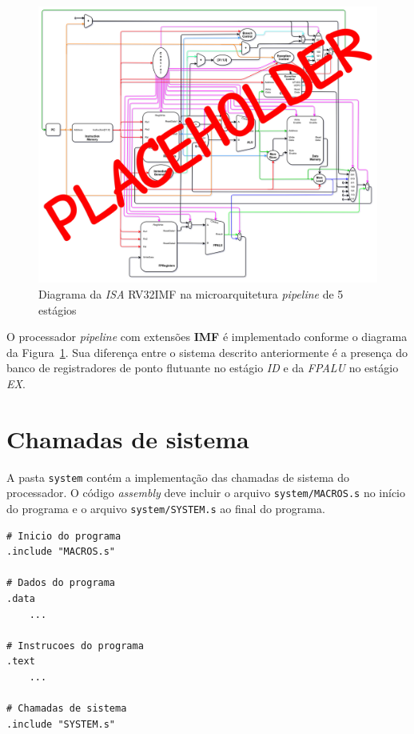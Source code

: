         \begin{figure}[H]
        \centering
            \includegraphics[width=.9\linewidth]{../images/uarch_diagrams/pipeline-RV32IMF.png}
            \caption{Diagrama da \textit{ISA} RV32IMF na microarquitetura
                \textit{pipeline} de 5 estágios}\label{fig:diagram_rv32imf_pipe}
        \end{figure}

        { O processador \textit{pipeline} com extensões \textbf{IMF} é implementado
            conforme o diagrama da Figura~\ref{fig:diagram_rv32imf_pipe}. Sua
            diferença entre o sistema descrito anteriormente é a presença do
            banco de registradores de ponto flutuante no estágio \textit{ID} e
            da \textit{FPALU} no estágio \textit{EX}.
        }

\section{Chamadas de sistema}
    { A pasta \texttt{system} contém a implementação das chamadas de sistema do
        processador. O código \textit{assembly} deve incluir o arquivo
        \texttt{system/MACROS.s} no início do programa e o arquivo
        \texttt{system/SYSTEM.s} ao final do programa.
    }
    \begin{lstlisting}
# Inicio do programa
.include "MACROS.s"

# Dados do programa
.data
    ...

# Instrucoes do programa
.text
    ...

# Chamadas de sistema
.include "SYSTEM.s"
    \end{lstlisting}

